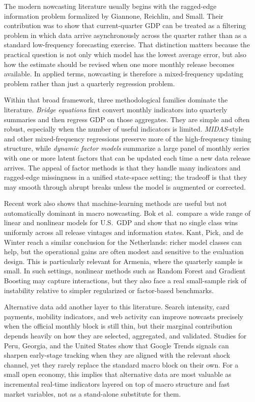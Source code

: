 \documentclass[12pt,a4paper]{report}
\begin{document}
The modern nowcasting literature usually begins with the ragged-edge information problem formalized by Giannone, Reichlin, and Small. Their contribution was to show that current-quarter GDP can be treated as a filtering problem in which data arrive asynchronously across the quarter rather than as a standard low-frequency forecasting exercise.\citep{Giannone2008} That distinction matters because the practical question is not only which model has the lowest average error, but also how the estimate should be revised when one more monthly release becomes available. In applied terms, nowcasting is therefore a mixed-frequency updating problem rather than just a quarterly regression problem.

Within that broad framework, three methodological families dominate the literature. \textit{Bridge equations} first convert monthly indicators into quarterly summaries and then regress GDP on those aggregates. They are simple and often robust, especially when the number of useful indicators is limited. \textit{MIDAS}-style and other mixed-frequency regressions preserve more of the high-frequency timing structure, while \textit{dynamic factor models} summarize a large panel of monthly series with one or more latent factors that can be updated each time a new data release arrives.\citep{Giannone2008,Bok2017} The appeal of factor methods is that they handle many indicators and ragged-edge missingness in a unified state-space setting; the tradeoff is that they may smooth through abrupt breaks unless the model is augmented or corrected.

Recent work also shows that machine-learning methods are useful but not automatically dominant in macro nowcasting. Bok et al.\ compare a wide range of linear and nonlinear models for U.S.\ GDP and show that no single class wins uniformly across all release vintages and information states.\citep{Bok2017} Kant, Pick, and de Winter reach a similar conclusion for the Netherlands: richer model classes can help, but the operational gains are often modest and sensitive to the evaluation design.\citep{NetherlandsDNB2022} This is particularly relevant for Armenia, where the quarterly sample is small. In such settings, nonlinear methods such as Random Forest and Gradient Boosting may capture interactions, but they also face a real small-sample risk of instability relative to simpler regularized or factor-based benchmarks.

Alternative data add another layer to this literature. Search intensity, card payments, mobility indicators, and web activity can improve nowcasts precisely when the official monthly block is still thin, but their marginal contribution depends heavily on how they are selected, aggregated, and validated. Studies for Peru, Georgia, and the United States show that Google Trends signals can sharpen early-stage tracking when they are aligned with the relevant shock channel, yet they rarely replace the standard macro block on their own.\citep{Peru2024,Georgia2022,US2022} For a small open economy, this implies that alternative data are most valuable as incremental real-time indicators layered on top of macro structure and fast market variables, not as a stand-alone substitute for them.
\end{document}
